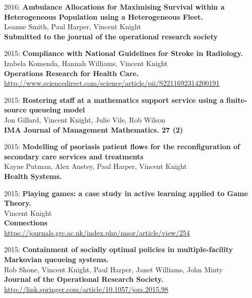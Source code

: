 \documentclass[10pt]{res} %
\begin{document}
\begin{resume}
\begin{etaremune}
\item
2016: \textbf{Ambulance Allocations for Maximising Survival within a Heterogeneous Population using a Heterogeneous Fleet.}\\
Leanne Smith, Paul Harper, Vincent Knight
\\
\textbf{Submitted to the journal of the operational research society}
\\

\item
2015: \textbf{Compliance with National Guidelines for Stroke in Radiology.}\\
Izabela Komenda, Hannah Williams, Vincent Knight
\\
\textbf{Operations Research for Health Care.}
\\
\url{http://www.sciencedirect.com/science/article/pii/S2211692314200191}
\\

\item
2015: \textbf{Rostering staff at a mathematics support service using a finite-source queueing model}\\
Jon Gillard, Vincent Knight, Julie Vile, Rob Wilson
\\
\textbf{IMA Journal of Management Mathematics. 27 (2)}
\\

\item
2015: \textbf{Modelling of psoriasis patient flows for the reconfiguration of secondary care services and treatments}\\
Kayne Putman, Alex Anstey, Paul Harper, Vincent Knight
\\
\textbf{Health Systems.}
\\

\item
2015: \textbf{Playing games: a case study in active learning applied to Game Theory.}\\
Vincent Knight
\\
\textbf{Connections}
\\
\url{https://journals.gre.ac.uk/index.php/msor/article/view/254}
\\

\item
2015: \textbf{Containment of socially optimal policies in multiple-facility Markovian queueing systems.}\\
Rob Shone, Vincent Knight, Paul Harper, Janet Williams, John Minty
\\
\textbf{Journal of the Operational Research Society.}
\\
\url{http://link.springer.com/article/10.1057/jors.2015.98}
\\


\end{etaremune}
\end{resume}
\end{document}

